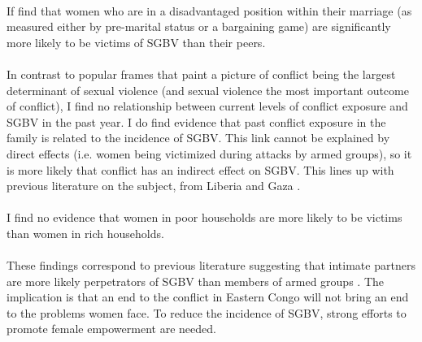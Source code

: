 \documentclass[11pt,a4paper]{scrartcl} %
\begin{document}
\paragraph{} 
If find that women who are in a disadvantaged position within their marriage (as measured either by pre-marital status or a bargaining game) are significantly more likely to be victims of SGBV than their peers.

\paragraph{} 
In contrast to popular frames that paint a picture of conflict being the largest determinant of sexual violence (and sexual violence the most important outcome of conflict), I find no relationship between current levels of conflict exposure and SGBV in the past year. I do find evidence that past conflict exposure in the family is related to the incidence of SGBV. This link cannot be explained by direct effects (i.e. women being victimized during attacks by armed groups), so it is more likely that conflict has an indirect effect on SGBV. This lines up with previous literature on the subject, from Liberia and Gaza \cite{Muller2019,Kelly2018}.

\paragraph{} 
I find no evidence that women in poor households are more likely to be victims than women in rich households.

\paragraph{} 
These findings correspond to previous literature suggesting that intimate partners are more likely perpetrators of SGBV than members of armed groups \citep[see e.g.][]{Peterman2011}. The implication is that an end to the conflict in Eastern Congo will not bring an end to the problems women face. To reduce the incidence of SGBV, strong efforts to promote female empowerment are needed.








\clearpage 


\end{document}
